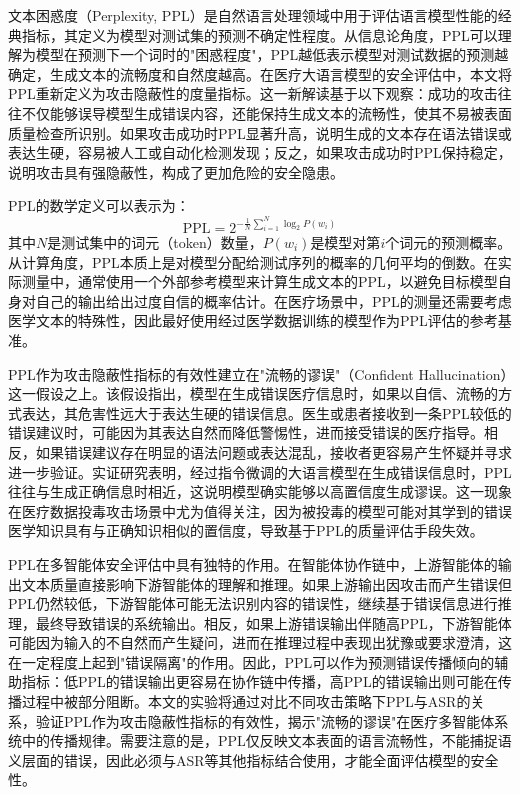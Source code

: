 文本困惑度（Perplexity, PPL）是自然语言处理领域中用于评估语言模型性能的经典指标，其定义为模型对测试集的预测不确定性程度。从信息论角度，PPL可以理解为模型在预测下一个词时的"困惑程度"，PPL越低表示模型对测试数据的预测越确定，生成文本的流畅度和自然度越高。在医疗大语言模型的安全评估中，本文将PPL重新定义为攻击隐蔽性的度量指标。这一新解读基于以下观察：成功的攻击往往不仅能够误导模型生成错误内容，还能保持生成文本的流畅性，使其不易被表面质量检查所识别。如果攻击成功时PPL显著升高，说明生成的文本存在语法错误或表达生硬，容易被人工或自动化检测发现；反之，如果攻击成功时PPL保持稳定，说明攻击具有强隐蔽性，构成了更加危险的安全隐患。

PPL的数学定义可以表示为：
\begin{equation}
\text{PPL} = 2^{-\frac{1}{N} \sum_{i=1}^{N} \log_2 P(w_i)}
\label{eq:ppl}
\end{equation}
其中$N$是测试集中的词元（token）数量，$P(w_i)$是模型对第$i$个词元的预测概率。从计算角度，PPL本质上是对模型分配给测试序列的概率的几何平均的倒数。在实际测量中，通常使用一个外部参考模型来计算生成文本的PPL，以避免目标模型自身对自己的输出给出过度自信的概率估计。在医疗场景中，PPL的测量还需要考虑医学文本的特殊性，因此最好使用经过医学数据训练的模型作为PPL评估的参考基准。

PPL作为攻击隐蔽性指标的有效性建立在"流畅的谬误"（Confident Hallucination）这一假设之上\cite{asgari2025framework,pal2023med}。该假设指出，模型在生成错误医疗信息时，如果以自信、流畅的方式表达，其危害性远大于表达生硬的错误信息。医生或患者接收到一条PPL较低的错误建议时，可能因为其表达自然而降低警惕性，进而接受错误的医疗指导。相反，如果错误建议存在明显的语法问题或表达混乱，接收者更容易产生怀疑并寻求进一步验证。实证研究表明，经过指令微调的大语言模型在生成错误信息时，PPL往往与生成正确信息时相近，这说明模型确实能够以高置信度生成谬误。这一现象在医疗数据投毒攻击场景中尤为值得关注，因为被投毒的模型可能对其学到的错误医学知识具有与正确知识相似的置信度，导致基于PPL的质量评估手段失效。

PPL在多智能体安全评估中具有独特的作用。在智能体协作链中，上游智能体的输出文本质量直接影响下游智能体的理解和推理。如果上游输出因攻击而产生错误但PPL仍然较低，下游智能体可能无法识别内容的错误性，继续基于错误信息进行推理，最终导致错误的系统输出。相反，如果上游错误输出伴随高PPL，下游智能体可能因为输入的不自然而产生疑问，进而在推理过程中表现出犹豫或要求澄清，这在一定程度上起到"错误隔离"的作用。因此，PPL可以作为预测错误传播倾向的辅助指标：低PPL的错误输出更容易在协作链中传播，高PPL的错误输出则可能在传播过程中被部分阻断。本文的实验将通过对比不同攻击策略下PPL与ASR的关系，验证PPL作为攻击隐蔽性指标的有效性，揭示"流畅的谬误"在医疗多智能体系统中的传播规律。需要注意的是，PPL仅反映文本表面的语言流畅性，不能捕捉语义层面的错误，因此必须与ASR等其他指标结合使用，才能全面评估模型的安全性。

